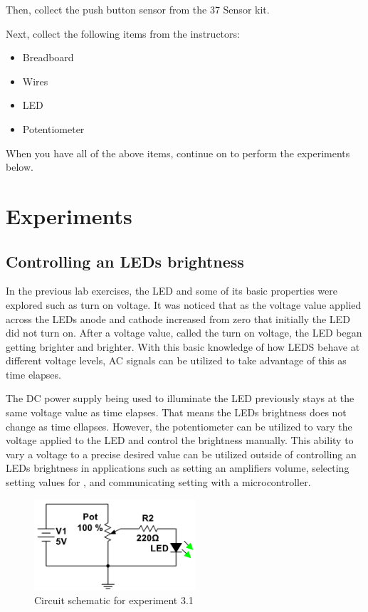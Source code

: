 \documentclass[12pt]{article}
\begin{document}
Then, collect the push button sensor from the 37 Sensor kit. 

Next, collect the following items from the instructors:

\begin{itemize}
    \item Breadboard
    \item Wires
    \item LED
    \item Potentiometer
\end{itemize}

When you have all of the above items, continue on to perform the experiments below.

\section{Experiments}
\subsection{Controlling an LEDs brightness}

In the previous lab exercises, the LED and some of its basic properties were explored such as turn on voltage. It was noticed that as the voltage value applied across the LEDs anode and cathode increased from zero that initially the LED did not turn on. After a voltage value, called the turn on voltage, the LED began getting brighter and brighter. With this basic knowledge of how LEDS behave at different voltage levels, AC signals can be utilized to take advantage of this as time elapses.

The DC power supply being used to illuminate the LED previously stays at the same voltage value as time elapses. That means the LEDs brightness does not change as time ellapses. However, the potentiometer can be utilized to vary the voltage applied to the LED and control the brightness manually. This ability to vary a voltage to a precise desired value can be utilized outside of controlling an LEDs brightness in applications such as setting an amplifiers volume, selecting setting values for , and communicating setting with a microcontroller.

\begin{figure}[H]
    \centering
    \includegraphics[width=6cm]{photos/lab/ledcircuit.PNG}
    \caption{Circuit schematic for experiment 3.1}
\end{figure}
\end{document}
